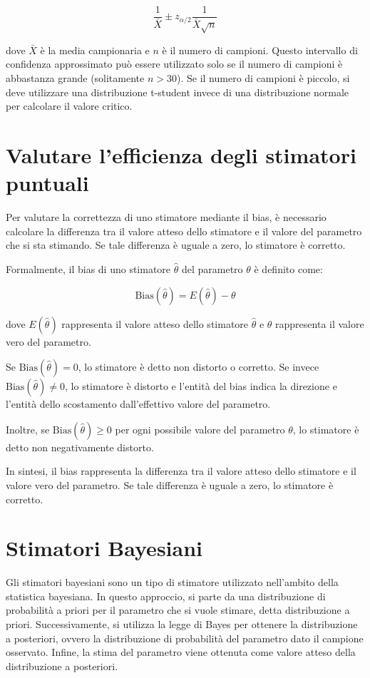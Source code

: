 $$\frac{1}{\bar{X}} \pm z_{\alpha/2} \frac{1}{\bar{X}\sqrt{n}}$$

dove $\bar{X}$ è la media campionaria e $n$ è il numero di campioni. Questo intervallo di confidenza approssimato può essere utilizzato solo se il numero di campioni è abbastanza grande (solitamente $n>30$). Se il numero di campioni è piccolo, si deve utilizzare una distribuzione t-student invece di una distribuzione normale per calcolare il valore critico.


\section{Valutare l'efficienza degli stimatori puntuali}

Per valutare la correttezza di uno stimatore mediante il bias, è necessario calcolare la differenza tra il valore atteso dello stimatore e il valore del parametro che si sta stimando. Se tale differenza è uguale a zero, lo stimatore è corretto.

Formalmente, il bias di uno stimatore $\hat{\theta}$ del parametro $\theta$ è definito come:

$$
\text{Bias}(\hat{\theta}) = E(\hat{\theta}) - \theta
$$

dove $E(\hat{\theta})$ rappresenta il valore atteso dello stimatore $\hat{\theta}$ e $\theta$ rappresenta il valore vero del parametro.

Se $\text{Bias}(\hat{\theta}) = 0$, lo stimatore è detto non distorto o corretto. Se invece $\text{Bias}(\hat{\theta}) \neq 0$, lo stimatore è distorto e l'entità del bias indica la direzione e l'entità dello scostamento dall'effettivo valore del parametro.

Inoltre, se $\text{Bias}(\hat{\theta}) \geq 0$ per ogni possibile valore del parametro $\theta$, lo stimatore è detto non negativamente distorto.

In sintesi, il bias rappresenta la differenza tra il valore atteso dello stimatore e il valore vero del parametro. Se tale differenza è uguale a zero, lo stimatore è corretto.


\section{Stimatori Bayesiani}
Gli stimatori bayesiani sono un tipo di stimatore utilizzato nell'ambito della statistica bayesiana. In questo approccio, si parte da una distribuzione di probabilità a priori per il parametro che si vuole stimare, detta distribuzione a priori. Successivamente, si utilizza la legge di Bayes per ottenere la distribuzione a posteriori, ovvero la distribuzione di probabilità del parametro dato il campione osservato. Infine, la stima del parametro viene ottenuta come valore atteso della distribuzione a posteriori.

